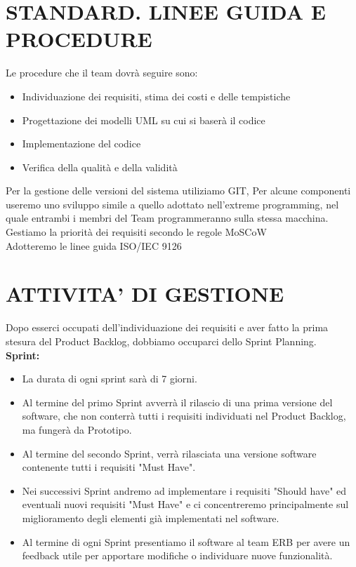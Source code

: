 \documentclass{report}
\begin{document}
\begingroup
\let\clearpage\relax
\chapter{STANDARD. LINEE GUIDA E PROCEDURE}
\endgroup

Le procedure che il team dovrà seguire sono:
\begin{itemize}
\item Individuazione dei requisiti, stima dei costi e delle tempistiche
\item Progettazione dei modelli UML su cui si baserà il codice
\item Implementazione del codice
\item Verifica della qualità e della validità
\end{itemize}
Per la gestione delle versioni del sistema utiliziamo GIT, Per alcune componenti useremo uno sviluppo simile a quello adottato nell'extreme programming, nel quale entrambi i membri del Team programmeranno sulla stessa macchina.\\
Gestiamo la priorità dei requisiti secondo le regole MoSCoW\\
Adotteremo le linee guida ISO/IEC 9126


\chapter{ATTIVITA' DI GESTIONE}
Dopo esserci occupati dell'individuazione dei requisiti e aver fatto la prima stesura del Product Backlog, dobbiamo occuparci dello Sprint Planning.	\\
\textbf{Sprint:}\\
\begin{itemize}
\item La durata di ogni sprint sarà di 7 giorni.
\item Al termine del primo Sprint avverrà il rilascio di una prima versione del software, che non conterrà tutti i requisiti individuati nel Product Backlog, ma fungerà da Prototipo.
\item Al termine del secondo Sprint, verrà rilasciata una versione software contenente tutti i requisiti "Must Have".
\item Nei successivi Sprint andremo ad implementare i requisiti "Should have" ed eventuali nuovi requisiti "Must Have" e ci concentreremo principalmente sul miglioramento degli elementi già implementati nel software.
\item Al termine di ogni Sprint presentiamo il software al team ERB per avere un feedback utile per apportare modifiche o individuare nuove funzionalità.
\end{itemize}
\end{document}

